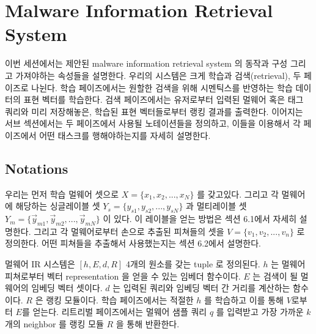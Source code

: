 \section{Malware Information Retrieval System}
이번 세션에서는 제안된 malware information retrieval system 의 동작과 구성 그리고 가져야하는 속성들을 설명한다. 우리의 시스템은 크게 학습과 검색(retrieval), 두 페이즈로 나뉜다. 학습 페이즈에서는 원할한 검색을 위해 시멘틱스를 반영하는 학습 데이터의 표현 벡터를 학습한다. 검색 페이즈에서는 유저로부터 입력된 멀웨어 혹은 태그 쿼리와 미리 저장해놓은, 학습된 표현 벡터들로부터 랭킹 결과를 출력한다. 이어지는 서브 섹션에서는 두 페이즈에서 사용될 노테이션들을 정의하고, 이들을 이용해서 각 페이즈에서 어떤 태스크를 행해야하는지를 자세히 설명한다.  


\subsection{Notations}
우리는 먼저 학습 멀웨어 셋으로 $X = \{x_1, x_2, ..., x_N\}$ 를 갖고있다. 그리고 각 멀웨어에 해당하는 싱글레이블 셋 $Y_s = \{y_{s1}, y_{s2}, ..., y_{sN}\}$ 과 멀티레이블 셋 $Y_m = \{\vec{y}_{m1}, \vec{y}_{m2}, ... , \vec{y}_{mN}\}$ 이 있다. 이 레이블을 얻는 방법은 섹션 6.1에서 자세히 설명한다. 그리고 각 멀웨어로부터 손으로 추출된 피쳐들의 셋을 $V = \{v_1, v_2, ..., v_n \}$ 로 정의한다. 어떤 피쳐들을 추출해서 사용했는지는 섹션 6.2에서 설명한다. 

멀웨어 IR 시스템은 $[h, E, d, R]$ 4개의 원소를 갖는 tuple 로 정의된다. $h$ 는 멀웨어 피쳐로부터 벡터 representation 을 얻을 수 있는 임베더 함수이다. $E$ 는 검색이 될 멀웨어의 임베딩 벡터 셋이다. $d$ 는 입력된 쿼리와 임베딩 벡터 간 거리를 계산하는 함수이다. $R$ 은 랭킹 모듈이다. 학습 페이즈에서는 적절한 $h$ 를 학습하고 이를 통해 $V$로부터 $E$를 얻는다. 리트리벌 페이즈에서는 멀웨어 샘플 쿼리 $q$ 를 입력받고 가장 가까운 $k$ 개의 neighbor 를 랭킹 모듈 $R$ 을 통해 반환한다.

